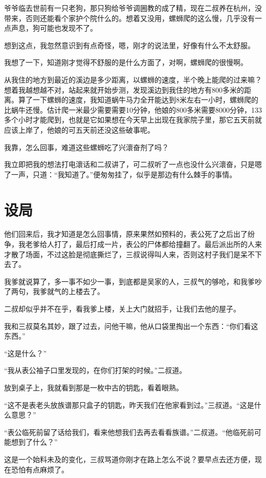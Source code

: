 爷爷临去世前有一只老狗，那只狗给爷爷调圌教的成了精，现在二叔养在杭州，没带来，否则还能看个家护个院什么的。想着又没用，螺蛳爬的这么慢，几乎没有一点声息，狗可能也发现不了。

想到这点，我忽然意识到有点奇怪，嗯，刚才的说法里，好像有什么不太舒服。

我想了一下，知道刚才觉得不舒服的是什么方面了，对啊，螺蛳爬的很慢啊。

从我住的地方到最近的溪边是多少距离，以螺蛳的速度，半个晚上能爬的过来嘛？想着我越想越不对，站起来就开始步测，发现溪边到我住的地方有800多米的距离。算了一下螺蛳的速度，我知道蜗牛马力全开能达到8米左右一小时，螺蛳爬的比蜗牛还慢。估计爬一米最少需要需要10分钟，他娘的800多米需要8000分钟，133多个小时才能爬到，也就是它如果想在今天早上出现在我家院子里，那它五天前就应该上岸了，他娘的可五天前还没这些破事呢。

我靠，怎么回事，难道这些螺蛳吃了兴瀤奋剂了吗？

我立即把我的想法打电瀤话和二叔讲了，可二叔听了一点也没什么兴瀤奋，只是嗯了一声，只道：“我知道了。”便匆匆挂了，似乎是那边有什么棘手的事情。

\chapter{设局}

他们回来后，我才知道是怎么回事情，原来果然如预料的，表公死了之后出了纷争，我老爹给人打了，最后打成一片，表公的尸体都给撞翻了。最后派出所的人来才散了场面，不过这脸是彻底撕烂了，三叔说得叫人来，否则这村子我们是呆不下去了。

我爹就说算了，多一事不如少一事，到底都是吴家的人，三叔气的够呛，和我爹吵了两句，我爹就气的上楼去了。

二叔却似乎并不在乎，看我爹上楼，关上大门就招手，让我们去他的屋子。

我和三叔莫名其妙，跟了过去，问他干嘛，他从口袋里掏出一个东西：“你们看这东西。”

“这是什么？”

“我从表公袖子口里发现的，在你们打架的时候。”二叔道。

放到桌子上，我就看到那是一枚中古的钥匙，看着眼熟。

“这不是表老头放族谱那只盒子的钥匙，昨天我们在他家看到过。”三叔道。“这是什么意思？”

“表公临死前留了话给我们，看来他想我们去再去看看族谱。”二叔道。“他临死前可能想到了什么？”

这是一个始料未及的变化，三叔骂道你刚才在路上怎么不说？要早点去还方便，现在恐怕有点麻烦了。

